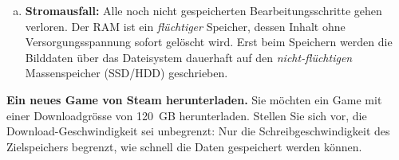 \begin{myexercise}
\begin{myanswer}
\begin{enumerate}[(a)]
            \item \textbf{Stromausfall:} Alle noch nicht gespeicherten Bearbeitungsschritte gehen verloren. Der \gls{RAM} ist ein \emph{flüchtiger} Speicher, dessen Inhalt ohne Versorgungsspannung sofort gelöscht wird. Erst beim Speichern werden die Bilddaten über das Dateisystem dauerhaft auf den \emph{nicht-flüchtigen} Massenspeicher (\gls{SSD}/\gls{HDD}) geschrieben.
        \end{enumerate}
    \end{myanswer}
\end{myexercise}

\begin{myexercise}\label{myexercise:steam-speicherzeit}
    \textbf{Ein neues Game von Steam herunterladen.}
    Sie möchten ein Game mit einer Downloadgrösse von 120~GB herunterladen. Stellen Sie sich vor, die Download-Geschwindigkeit sei unbegrenzt: Nur die Schreibgeschwindigkeit des Zielspeichers begrenzt, wie schnell die Daten gespeichert werden können.


\end{myexercise}
